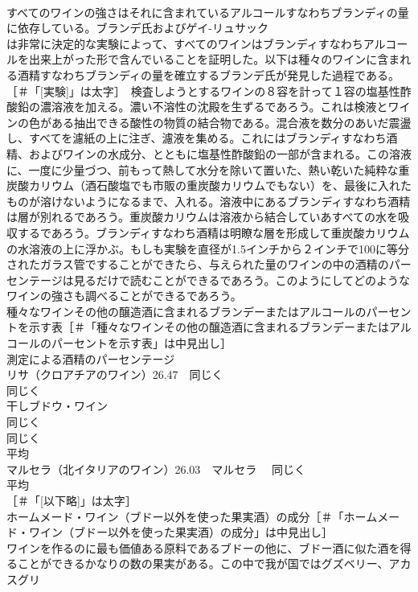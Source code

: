 \documentclass[8pt]{extreport}
\begin{document}
\begin{CJK}{UTF8}{min}
\\	すべてのワインの強さはそれに含まれているアルコールすなわちブランディの量に依存している。ブランデ氏およびゲイ-リュサック
\\	は非常に決定的な実験によって、すべてのワインはブランディすなわちアルコールを出来上がった形で含んでいることを証明した。以下は種々のワインに含まれる酒精すなわちブランディの量を確立するブランデ氏が発見した過程である。
\\	[実験]［＃「[実験]」は太字］　検査しようとするワインの８容を計って１容の塩基性酢酸鉛の濃溶液を加える。濃い不溶性の沈殿を生ずるであろう。これは検液とワインの色がある抽出できる酸性の物質の結合物である。混合液を数分のあいだ震盪し、すべてを濾紙の上に注ぎ、濾液を集める。これにはブランディすなわち酒精、およびワインの水成分、とともに塩基性酢酸鉛の一部が含まれる。この溶液に、一度に少量づつ、前もって熱して水分を除いて置いた、熱い乾いた純粋な重炭酸カリウム（酒石酸塩でも市販の重炭酸カリウムでもない）を、最後に入れたものが溶けないようになるまで、入れる。溶液中にあるブランディすなわち酒精は層が別れるであろう。重炭酸カリウムは溶液から結合していあすべての水を吸収するであろう。ブランディすなわち酒精は明瞭な層を形成して重炭酸カリウムの水溶液の上に浮かぶ。もしも実験を直径が1.5インチから２インチで100に等分されたガラス管ですることができたら、与えられた量のワインの中の酒精のパーセンテージは見るだけで読むことができるであろう。このようにしてどのようなワインの強さも調べることができるであろう。
\\	種々なワインその他の醸造酒に含まれるブランデーまたはアルコールのパーセントを示す表［＃「種々なワインその他の醸造酒に含まれるブランデーまたはアルコールのパーセントを示す表」は中見出し］
\\	測定による酒精のパーセンテージ
\\	リサ（クロアチアのワイン）26.47　同じく 
\\	同じく　
\\	干しブドウ・ワイン 
\\	同じく 
\\	同じく 
\\	平均　
\\	マルセラ（北イタリアのワイン）26.03　マルセラ　 同じく　
\\	平均　
\\	[以下略]［＃「[以下略]」は太字］
\\	ホームメード・ワイン（ブドー以外を使った果実酒）の成分［＃「ホームメード・ワイン（ブドー以外を使った果実酒）の成分」は中見出し］
\\	ワインを作るのに最も価値ある原料であるブドーの他に、ブドー酒に似た酒を得ることができるかなりの数の果実がある。この中で我が国ではグズベリー、アカスグリ

\end{CJK}
\end{document}
